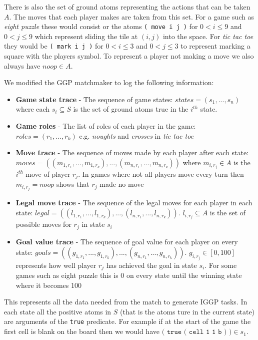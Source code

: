 There is also the set of ground atoms representing the actions that can be taken $A$. The moves that each player makes are taken from this set. For a game such as \textit{eight puzzle} these would consist or the atoms \verb|( move i j )| for $0<i\leq 9$ and $0<j\leq 9$ which represent sliding the tile at $(i,j)$ into the space. For \textit{tic tac toe} they would be \verb|( mark i j )| for $0<i\leq 3$ and $0<j\leq 3$ to represent marking a square with the players symbol. To represent a player not making a move we also always have $noop \in A$.

We modified the GGP matchmaker to log the following information:
\begin{itemize}
	\item \textbf{Game state trace} - The sequence of game states: $states = (s_1,...,s_n)$ where each $s_i \subseteq S$ is the set of ground atoms true in the $i^{th}$ state.
	\item \textbf{Game roles} - The list of roles of each player in the game: $roles = (r_1,...,r_k)$ e.g. \textit{noughts} and \textit{crosses} in \textit{tic tac toe}
	\item \textbf{Move trace} - The sequence of moves made by each player after each state: $moves = ((m_{1,r_1},...,m_{1,r_k}),...,(m_{n,r_1},...,m_{n,r_k}))$ where $m_{i,r_j} \in A$ is the $i^{th}$ move of player $r_j$. In games where not all players move every turn then $m_{i,r_j}=noop$ shows that $r_j$ made no move
	\item \textbf{Legal move trace} - The sequence of the legal moves for each player in each state:  $legal = ((l_{1,r_1},...,l_{1,r_k}),...,(l_{n,r_1},...,l_{n,r_k}))$. $l_{i,r_j} \subseteq A$ is the set of possible moves for $r_j$ in state $s_i$
	\item \textbf{Goal value trace} - The sequence of goal value for each player on every state: $goals = ((g_{1,r_1},...,g_{1,r_k}),...,(g_{n,r_1},...,g_{n,r_k}))$. $g_{i,r_j} \in [0,100]$ represents how well player $r_j$ has achieved the goal in state $s_i$. For some games such as eight puzzle this is 0 on every state until the winning state where it becomes 100

\end{itemize}
This represents all the data needed from the match to generate IGGP tasks. In each state all the positive atoms in $S$ (that is the atoms ture in the current state) are arguments of the \texttt{true} predicate. For example if at the start of the game the first cell is blank on the board then we would have $\texttt{( true ( cell 1 1 b ) )} \in s_1$.


